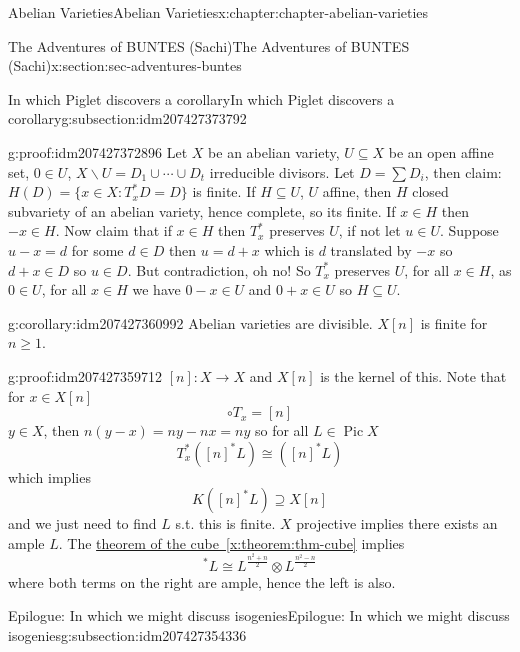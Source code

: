 \documentclass[oneside,10pt,]{book}
\numberwithin{equation}{section}
\DeclareMathOperator{\Pic}{Pic}
\begin{document}
\begin{chapterptx}{Abelian Varieties}{}{Abelian Varieties}{}{}{x:chapter:chapter-abelian-varieties}
\begin{sectionptx}{The Adventures of BUNTES (Sachi)}{}{The Adventures of BUNTES (Sachi)}{}{}{x:section:sec-adventures-buntes}
\begin{subsectionptx}{In which Piglet discovers a corollary}{}{In which Piglet discovers a corollary}{}{}{g:subsection:idm207427373792}
\begin{proofptx}{}{g:proof:idm207427372896}
Let \(X\) be an abelian variety, \(U \subseteq X\) be an open affine set, \(0\in U\), \(X\smallsetminus U = D_1 \cup \cdots \cup D_t\) irreducible divisors. Let \(D = \sum D_i\), then claim: \(H(D) = \{x\in X: T_x^*D  = D \}\) is finite. If \(H\subseteq U\), \(U\) affine, then \(H\) closed subvariety of an abelian variety, hence complete, so its finite. If \(x\in H\) then \(-x \in H\). Now claim that if \(x\in H\) then \(T_x^*\) preserves \(U\), if not let \(u\in U\). Suppose \(u-x = d\) for some \(d\in D\) then \(u = d+x\) which is \(d\) translated by \(-x\) so \(d+x \in D\) so \(u\in D\). But contradiction, oh no! So \(T_x^*\) preserves \(U\), for all \(x\in H\), as \(0 \in U\), for all \(x\in H\) we have \(0-x \in U\) and  \(0+x\in U\) so \(H\subseteq U\).%
\end{proofptx}
\begin{corollary}{}{}{g:corollary:idm207427360992}%
Abelian varieties are divisible. \(X[n]\) is finite for \(n\ge 1\).%
\end{corollary}
\begin{proofptx}{}{g:proof:idm207427359712}
\([n]\colon X \to X\) and \(X[n]\) is the kernel of this. Note that for \(x\in X[n]\)%
\begin{equation*}
[n]\circ T_x = [n]
\end{equation*}
\(y\in X\), then \(n(y-x) = ny - nx = ny\) so for all \(L \in \Pic X\)%
\begin{equation*}
T_x^*([n]^* L ) \cong ([n]^* L)
\end{equation*}
which implies%
\begin{equation*}
K([n]^* L ) \supseteq X[n]
\end{equation*}
and we just need to find \(L\) s.t. this is finite. \(X\) projective implies there exists an ample \(L\). The \hyperref[x:theorem:thm-cube]{theorem of the cube~\ref{x:theorem:thm-cube}} implies%
\begin{equation*}
[n]^*L \cong L^{\frac{n^2 + n}{2}} \otimes L^{\frac{n^2 - n}{2}}
\end{equation*}
where both terms on the right are ample, hence the left is also.%
\end{proofptx}
\end{subsectionptx}
%
%
\typeout{************************************************}
\typeout{************************************************}
%
\begin{subsectionptx}{Epilogue: In which we might discuss isogenies}{}{Epilogue: In which we might discuss isogenies}{}{}{g:subsection:idm207427354336}

\end{subsectionptx}
\end{sectionptx}
\end{chapterptx}
\end{document}
